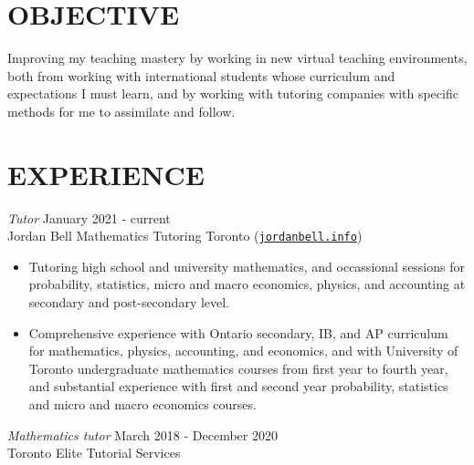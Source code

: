 \documentclass[margin, 10pt]{res} %
\begin{document}
\begin{resume}

 
\section{OBJECTIVE}  

Improving my teaching mastery by working in new virtual teaching environments, both from working with international students whose curriculum and expectations I must learn, and by working with tutoring companies with specific methods for me to assimilate and follow.


 
\section{EXPERIENCE}

{\sl Tutor} \hfill January 2021 - current \\
Jordan Bell Mathematics Tutoring Toronto (\href{https://jordanbell.info/}{\texttt{jordanbell.info}})

\begin{itemize} \itemsep -2pt %
\item Tutoring high school and university mathematics, and occassional sessions for
probability, statistics, micro and macro economics, physics, and accounting at secondary and post-secondary level.

\item Comprehensive experience with Ontario secondary, IB, and AP curriculum for mathematics, physics, accounting, and economics, and with University of Toronto undergraduate mathematics courses from first year to fourth year, and substantial experience with first and second year probability, statistics and micro and macro economics courses.
\end{itemize}

{\sl Mathematics tutor} \hfill March 2018 - December 2020 \\
Toronto Elite Tutorial Services


\end{resume}
\end{document}
